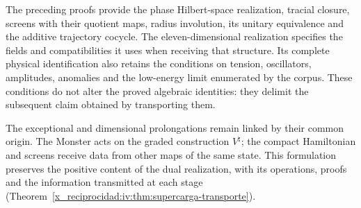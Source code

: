 The preceding proofs provide the phase Hilbert-space
realization, tracial closure, screens
with their quotient maps, radius involution,
its unitary equivalence and the additive trajectory
cocycle. The eleven-dimensional realization
specifies the fields and compatibilities it
uses when receiving that structure. Its complete physical
identification also retains the conditions
on tension, oscillators, amplitudes, anomalies and
the low-energy limit enumerated by the corpus.
These conditions do not alter the proved algebraic
identities: they delimit the subsequent claim
obtained by transporting them.

The exceptional and dimensional prolongations
remain linked by their common origin. The
Monster acts on the graded construction
\(V^\natural\); the compact Hamiltonian and
screens receive data from other maps of the
same state. This formulation preserves the
positive content of the dual realization,
with its operations, proofs and the information
transmitted at each stage (Theorem~\ref{x_reciprocidad:iv:thm:supercarga-transporte}).
